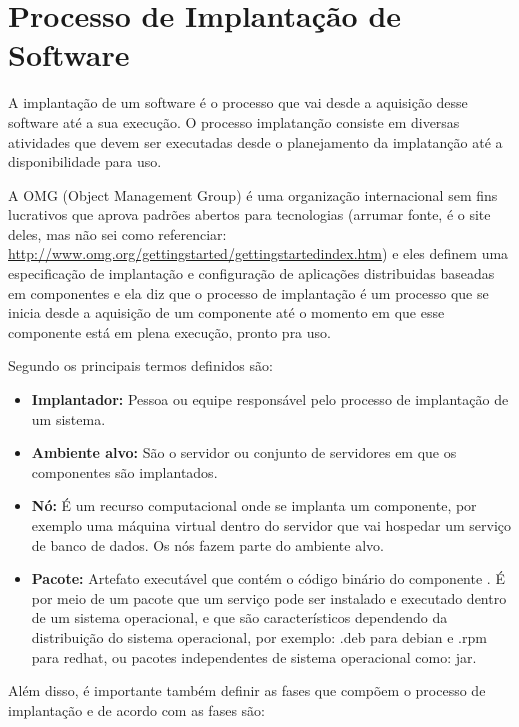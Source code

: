 \section{Processo de Implantação de Software}

A implantação de um software é o processo que vai desde a aquisição desse software
até a sua execução. \cite{leo2014} O processo implatanção consiste em diversas
atividades que devem ser executadas desde o planejamento da implatanção até a
disponibilidade para uso.

A OMG (Object Management Group) é uma organização internacional sem fins lucrativos
que aprova padrões abertos para tecnologias (arrumar fonte, é o site deles, mas
não sei como referenciar: \url{http://www.omg.org/gettingstarted/gettingstartedindex.htm})
e eles definem uma especificação de implantação e configuração de aplicações
distribuidas baseadas em componentes \cite{omg2006} e ela diz que o processo de
implantação é um processo que se inicia desde a aquisição de um componente até
o momento em que esse componente está em plena execução, pronto pra uso.

Segundo \cite{omg2006} os principais termos definidos são:

\begin{itemize}
  \item  \textbf{Implantador:} Pessoa ou equipe responsável pelo processo de
  implantação  de um sistema.
  \item  \textbf{Ambiente alvo:} São o servidor ou conjunto de servidores em
  que os componentes são implantados.
  \item  \textbf{Nó:} É um recurso computacional onde se implanta um componente,
  por exemplo uma máquina virtual dentro do servidor que vai hospedar um serviço
  de banco de dados. Os nós fazem parte do ambiente alvo.
  \item  \textbf{Pacote:} Artefato executável que contém o código binário do componente
  . É por meio de um pacote que um serviço pode ser instalado e executado dentro
  de um sistema operacional, e que são característicos dependendo da distribuição
  do sistema operacional, por exemplo: .deb para debian e .rpm para redhat, ou
  pacotes independentes de sistema operacional como: jar.
\end{itemize}

Além disso, é importante também definir as fases que compõem o processo de
implantação e de acordo com \cite{omg2006} as fases são:

